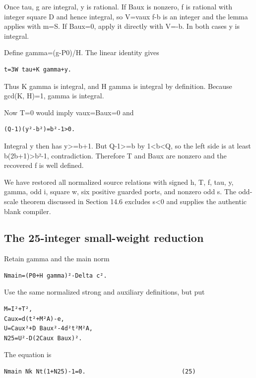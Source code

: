 \documentclass[
  10pt,
]{article}
\begin{document}
Once tau, g are integral, y is rational. If Baux is nonzero, f is
rational with integer square D and hence integral, so V=vaux f-b is an
integer and the lemma applies with m=\textbar S\textbar. If Baux=0,
apply it directly with V=-b. In both cases y is integral.

Define gamma=(g-P0)/H. The linear identity gives

\begin{verbatim}
t=3W tau+K gamma+y.
\end{verbatim}

Thus K gamma is integral, and H gamma is integral by definition. Because
gcd(K, H)=1, gamma is integral.

Now T=0 would imply vaux=Baux=0 and

\begin{verbatim}
(Q-1)(y²-b²)=b²-1>0.
\end{verbatim}

Integral y then has \textbar y\textbar\textgreater=b+1. But
Q-1\textgreater=b by 1\textless b\textless Q, so the left side is at
least b(2b+1)\textgreater b²-1, contradiction. Therefore T and Baux are
nonzero and the recovered f is well defined.

We have restored all normalized source relations with signed
h, T, f, tau, y, gamma, odd i, square w, six positive guarded ports, and
nonzero odd s. The odd-scale theorem discussed in Section 14.6 excludes
s\textless0 and supplies the authentic blank compiler.

\subsection{The 25-integer small-weight
reduction}\label{the-25-integer-small-weight-reduction}

Retain gamma and the main norm

\begin{verbatim}
Nmain=(P0+H gamma)²-Delta c².
\end{verbatim}

Use the same normalized strong and auxiliary definitions, but put

\begin{verbatim}
M=I²+T²,
Caux=d(t²+M²A)-e,
U=Caux²+D Baux²-4d²t²M²A,
N25=U²-D(2Caux Baux)².
\end{verbatim}

The equation is

\begin{verbatim}
Nmain Nk Nt(1+N25)-1=0.                           (25)
\end{verbatim}
\end{document}

